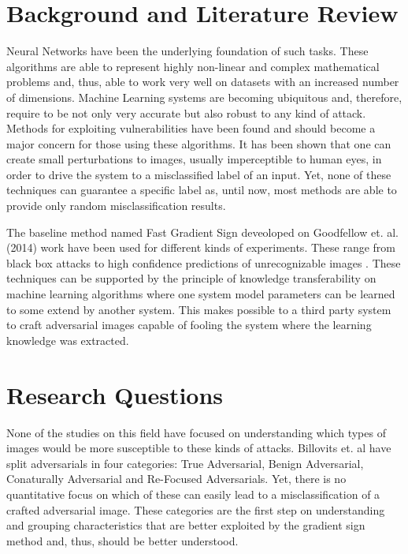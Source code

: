 \documentclass{article}
\begin{document}
\section{Background and Literature Review} \label{sec:lit}
Neural Networks have been the underlying foundation of such tasks. These algorithms are able to represent highly non-linear and complex mathematical problems and, thus,  able to work very well on datasets with an increased number of dimensions. Machine Learning systems are becoming ubiquitous and, therefore, require to be not only very accurate but also robust to any kind of attack. Methods for exploiting vulnerabilities have been found and should become a major concern for those using these algorithms. It has been shown that one can create small perturbations to images, usually imperceptible to human eyes, in order to drive the system to a misclassified label of an input. Yet, none of these techniques can guarantee a specific label as, until now, most methods are able to provide only random misclassification results.

The baseline method named Fast Gradient Sign deveoloped on Goodfellow et. al. (2014) work have been used for different kinds of experiments. These range from black box attacks \cite{papernot2016} to high confidence predictions of unrecognizable images \cite{nguyen2015}. These techniques can be supported by the principle of knowledge transferability on machine learning algorithms \cite{papernot2016transf} where one system model parameters can be learned to some extend by another system. This makes possible to a third party system to craft adversarial images capable of fooling the system where the learning knowledge was extracted.

\section{Research Questions} \label{sec: questions}

None of the studies on this field have focused on understanding which types of images would be more susceptible to these kinds of attacks. Billovits et. al \cite{billovits} have split adversarials in four categories: True Adversarial, Benign Adversarial, Conaturally Adversarial and Re-Focused Adversarials. Yet, there is no quantitative focus on which of these can easily lead to a misclassification of a crafted adversarial image. These categories are the first step on understanding and grouping characteristics that are better exploited by the gradient sign method and, thus, should be better understood.
\end{document}
